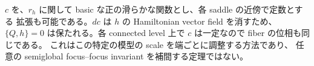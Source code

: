 \begin{remark}\label{lc:construction-variable-c}
$c$ を、$r_h$ に関して basic な正の滑らかな関数とし、各 saddle の近傍で定数とする
拡張も可能である。$dc$ は $h$ の Hamiltonian vector field を消すため、
$\{Q,h\}=0$ は保たれる。各 connected level 上で $c$ は一定なので fiber の位相も同じである。
これはこの特定の模型の scale を端ごとに調整する方法であり、
任意の semiglobal focus--focus invariant を補間する定理ではない。
\end{remark}
